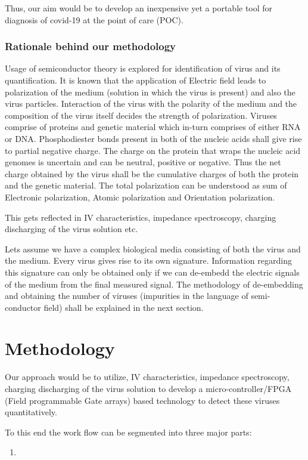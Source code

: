 \documentclass{FR16}
\begin{document}
Thus, our aim would be to develop an inexpensive yet a portable tool for diagnosis of covid-19 at the point of care (POC).


\subsubsection{Rationale behind our methodology}
Usage of semiconductor theory is explored for identification of virus and its quantification. It is known that the application of Electric field leads to polarization of the medium (solution in which the virus is present) and also the virus particles. Interaction of the virus with the polarity of the medium and the composition of the virus itself decides the strength of polarization. Viruses comprise of proteins and genetic material which in-turn comprises of either RNA or DNA. Phosphodiester bonds present in both of the nucleic acids shall give rise to partial negative charge. The charge on the protein that wraps the nucleic acid genomes is uncertain and can be neutral, positive or negative. Thus the net charge obtained by the virus shall be the cumulative charges of both the protein and the genetic material. The total polarization  can be understood as sum of Electronic polarization, Atomic polarization and Orientation polarization.

This gets reflected in IV  characteristics, impedance spectroscopy, charging discharging of the virus solution etc.

Lets assume we have a complex biological media consisting of both the virus and the medium. Every virus gives rise to its own signature. Information regarding this signature can only be obtained only if we can de-embedd  the electric signals of the medium from the final measured signal. The methodology of de-embedding and obtaining the number of viruses (impurities in the language of semi-conductor field) shall be explained in  the next section.





\newpage
\section{Methodology}
Our approach would be to utilize, IV  characteristics, impedance spectroscopy, charging discharging of the virus solution to develop a micro-controller/FPGA (Field programmable Gate arrays) based technology to detect these viruses quantitatively.


To this end the work flow can be segmented into three major parts:
\begin{enumerate}
    \item 
\end{enumerate}
\end{document}
